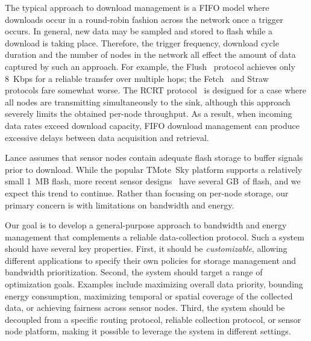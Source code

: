 The typical approach to download management is a FIFO model where downloads
occur in a round-robin fashion across the network once a trigger occurs. In
general, new data may be sampled and stored to flash while a download is
taking place.  Therefore, the trigger frequency, download cycle duration and
the number of nodes in the network all effect the amount of data captured by
such an approach.  For example, the Flush~\cite{flush-sensys07} protocol
achieves only 8~Kbps for a reliable transfer over multiple hops; the
Fetch~\cite{volcano-osdi06} and Straw~\cite{ggb-ipsn07} protocols fare
somewhat worse. The RCRT protocol~\cite{rcrt-sensys07} is designed for a case
where all nodes are transmitting simultaneously to the sink, although this
approach severely limits the obtained per-node throughput. As a result, when
incoming data rates exceed download capacity, FIFO download management can
produce excessive delays between data acquisition and retrieval.

Lance assumes that sensor nodes contain adequate flash storage to buffer
signals prior to download.  While the popular TMote~Sky platform supports a
relatively small 1~MB flash, more recent sensor designs~\cite{shimmer} have
several GB~of flash, and we expect this trend to continue. Rather than
focusing on per-node storage, our primary concern is with limitations on
bandwidth and energy.

Our goal is to develop a general-purpose approach to bandwidth and energy
management that complements a reliable data-collection protocol. Such a
system should have several key properties.  First, it should be {\em
customizable}, allowing different applications to specify their own policies
for storage management and bandwidth prioritization. Second, the system
should target a range of optimization goals. Examples include maximizing
overall data priority, bounding energy consumption, maximizing temporal or
spatial coverage of the collected data, or achieving fairness across sensor
nodes. Third, the system should be decoupled from a specific routing
protocol, reliable collection protocol, or sensor node platform, making it
possible to leverage the system in different settings. 
